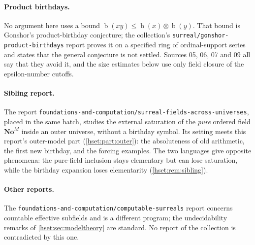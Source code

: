 \documentclass[11pt,letterpaper]{article}
\theoremstyle{definition}
\theoremstyle{remark}
\newcommand{\No}{\mathbf{No}}
\newcommand{\bd}{\operatorname{b}}
\newcommand{\nprod}{\mathbin{\otimes}}
\newcommand{\repo}[1]{\nolinkurl{#1}}
\begin{document}
\paragraph{Product birthdays.} No argument here uses a bound
$\bd(xy)\le\bd(x)\nprod\bd(y)$. That bound is Gonshor's product-birthday
conjecture; the collection's \repo{surreal/gonshor-product-birthdays} report
proves it on a specified ring of ordinal-support series and states that the
general conjecture is not settled. Sources 05, 06, 07 and 09 all say that they
avoid it, and the size estimates below use only field closure of the
epsilon-number cutoffs.

\paragraph{Sibling report.} The report
\repo{foundations-and-computation/surreal-fields-across-universes}, placed in the
same batch, studies the external saturation of the \emph{pure} ordered field
$\No^M$ inside an outer universe, without a birthday symbol. Its setting meets
this report's outer-model part (\cref{hset:part:outer}): the absoluteness of old
arithmetic, the first new birthday, and the forcing examples. The two languages
give opposite phenomena: the pure-field inclusion stays elementary but can lose
saturation, while the birthday expansion loses elementarity
(\cref{hset:rem:sibling}).

\paragraph{Other reports.} The \repo{foundations-and-computation/computable-surreals}
report concerns countable effective subfields and is a different program; the
undecidability remarks of \cref{hset:sec:modeltheory} are standard. No report of
the collection is contradicted by this one.
\end{document}
